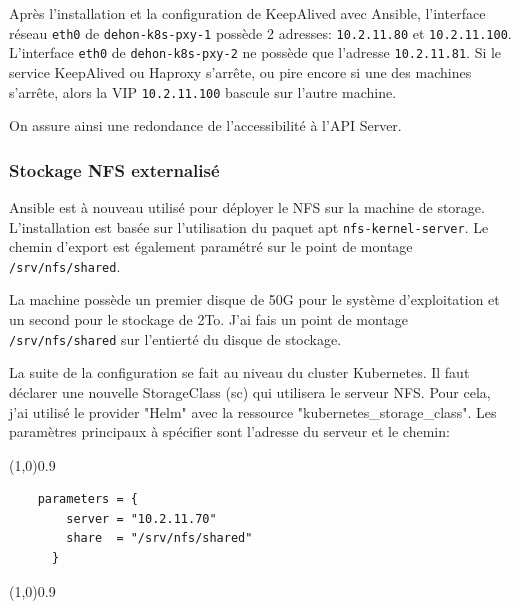 \documentclass[12pt]{article}
\begin{document}
Après l'installation et la configuration de KeepAlived avec \gls{Ansible}, l'interface réseau \verb|eth0| de \verb|dehon-k8s-pxy-1| possède 2 adresses: \verb|10.2.11.80| et \verb|10.2.11.100|.
L'interface \verb|eth0| de \verb|dehon-k8s-pxy-2| ne possède que l'adresse \verb|10.2.11.81|.
Si le service KeepAlived ou Haproxy s'arrête, ou pire encore si une des machines s'arrête, alors la VIP \verb|10.2.11.100| bascule sur l'autre machine.

On assure ainsi une redondance de l'accessibilité à l'\gls{API} Server.

\subsubsection{Stockage NFS externalisé}
\gls{Ansible} est à nouveau utilisé pour déployer le NFS sur la machine de storage.
L'installation est basée sur l'utilisation du paquet apt \verb|nfs-kernel-server|.
Le chemin d'export est également paramétré sur le point de montage \verb|/srv/nfs/shared|.

La machine possède un premier disque de 50G pour le système d'exploitation et un second pour le stockage de 2To.
J'ai fais un point de montage \verb|/srv/nfs/shared| sur l'entierté du disque de stockage.

La suite de la configuration se fait au niveau du \gls{cluster} \gls{Kubernetes}.
Il faut déclarer une nouvelle StorageClass (sc) qui utilisera le serveur NFS.
Pour cela, j'ai utilisé le provider "Helm" avec la ressource "kubernetes\_storage\_class".
Les paramètres principaux à spécifier sont l'adresse du serveur et le chemin:
\vspace{-1ex}
\begin{code}
\vspace{-1ex}
\begin{center} 
    \line(1,0){0.9\textwidth} 
\end{center}
\vspace{-1ex}
\begin{verbatim}
    parameters = {
        server = "10.2.11.70"
        share  = "/srv/nfs/shared"
      }
\end{verbatim}
\vspace{-1ex}
\begin{center} 
    \line(1,0){0.9\textwidth} 
\end{center}
\vspace{-1ex}
\end{code}
\end{document}
